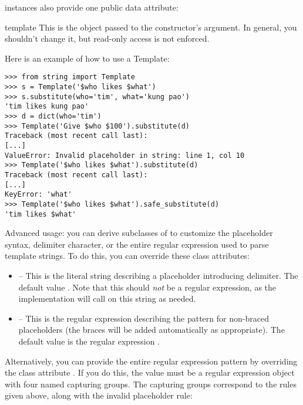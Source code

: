  instances also provide one public data attribute:

\begin{memberdesc}[string]{template}
This is the object passed to the constructor's  argument.  In
general, you shouldn't change it, but read-only access is not enforced.
\end{memberdesc}

Here is an example of how to use a Template:

\begin{verbatim}
>>> from string import Template
>>> s = Template('$who likes $what')
>>> s.substitute(who='tim', what='kung pao')
'tim likes kung pao'
>>> d = dict(who='tim')
>>> Template('Give $who $100').substitute(d)
Traceback (most recent call last):
[...]
ValueError: Invalid placeholder in string: line 1, col 10
>>> Template('$who likes $what').substitute(d)
Traceback (most recent call last):
[...]
KeyError: 'what'
>>> Template('$who likes $what').safe_substitute(d)
'tim likes $what'
\end{verbatim}

Advanced usage: you can derive subclasses of  to customize the
placeholder syntax, delimiter character, or the entire regular expression used
to parse template strings.  To do this, you can override these class
attributes:

\begin{itemize}
\item {} -- This is the literal string describing a placeholder
      introducing delimiter.  The default value \samp{\$}.  Note that this
      should \emph{not} be a regular expression, as the implementation will
      call  on this string as needed.
\item {} -- This is the regular expression describing the pattern
      for non-braced placeholders (the braces will be added automatically as
      appropriate).  The default value is the regular expression
      \samp{[_a-z][_a-z0-9]*}.
\end{itemize}

Alternatively, you can provide the entire regular expression pattern by
overriding the class attribute .  If you do this, the value must
be a regular expression object with four named capturing groups.  The
capturing groups correspond to the rules given above, along with the invalid
placeholder rule:

